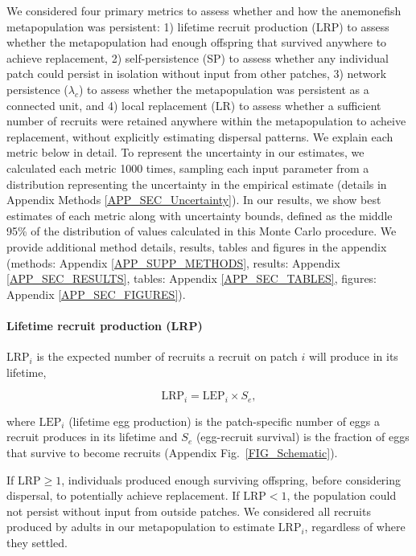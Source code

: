 \documentclass[12pt, oneside]{article}   	%
\begin{document}
We considered four primary metrics to assess whether and how the anemonefish metapopulation was persistent: 1) lifetime recruit production (LRP) to assess whether the metapopulation had enough offspring that survived anywhere to achieve replacement, 2) self-persistence (SP) to assess whether any individual patch could persist in isolation without input from other patches, 3) network persistence ($\lambda_c$) to assess whether the metapopulation was persistent as a connected unit, and 4) local replacement (LR) to assess whether a sufficient number of recruits were retained anywhere within the metapopulation to acheive replacement, without explicitly estimating dispersal patterns. We explain each metric below in detail. To represent the uncertainty in our estimates, we calculated each metric 1000 times, sampling each input parameter from a distribution representing the uncertainty in the empirical estimate (details in 
Appendix Methods \ref{APP_SEC_Uncertainty}). In our results, we show best estimates of each metric along with uncertainty bounds, defined as the middle 95\% of the distribution of values calculated in this Monte Carlo procedure. We provide additional method details, results, tables and figures in the appendix (methods: Appendix \ref{APP_SUPP_METHODS}, results: Appendix \ref{APP_SEC_RESULTS}, tables: Appendix \ref{APP_SEC_TABLES}, figures: Appendix \ref{APP_SEC_FIGURES}).%

\paragraph*{Lifetime recruit production (LRP)}
$\text{LRP}_i$ is the expected number of recruits a recruit on patch $i$ will produce in its lifetime,

\begin{equation}
\text{LRP}_i = \text{LEP}_i \times S_e, \label{EQN_LRP}
\end{equation}

where $\text{LEP}_i$ (lifetime egg production) is the patch-specific number of eggs a recruit produces in its lifetime and $S_e$ (egg-recruit survival) is the fraction of eggs that survive to become recruits (Appendix Fig.\ \ref{FIG_Schematic}).

If $\text{LRP} \geq 1$, individuals produced enough surviving offspring, before considering dispersal, to potentially achieve replacement. If $\text{LRP} < 1$, the population could not persist without input from outside patches. We considered all recruits produced by adults in our metapopulation to estimate $\text{LRP}_i$, regardless of where they settled. %
\end{document}
